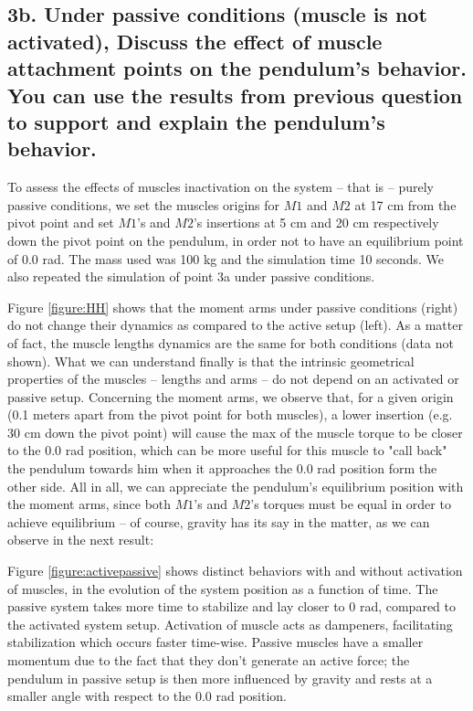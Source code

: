 \documentclass{cmc}
\begin{document}
\subsection*{3b. Under passive conditions (muscle is not activated),
  Discuss the effect of muscle attachment points on the pendulum's
  behavior. You can use the results from previous question to support
  and explain the pendulum's behavior.}
\label{sec:3b}

To assess the effects of muscles inactivation on the system -- that is -- purely passive conditions, we set the muscles origins for $M1$ and $M2$ at 17 cm from the pivot point and set $M1$'s and $M2$'s insertions at 5 cm and 20 cm respectively down the pivot point on the pendulum, in order not to have an equilibrium point of 0.0 rad. The mass used was 100 kg and the simulation time 10 seconds. We also repeated the simulation of point 3a under passive conditions.

Figure \ref{figure:HH} shows that the moment arms under passive conditions (right) do not change their dynamics as compared to the active setup (left). As a matter of fact, the muscle lengths dynamics are the same for both conditions (data not shown). What we can understand finally is that the intrinsic geometrical properties of the muscles -- lengths and arms -- do not depend on an activated or passive setup. Concerning the moment arms, we observe that, for a given origin (0.1 meters apart from the pivot point for both muscles), a lower insertion (e.g. 30 cm down the pivot point) will cause the max of the muscle torque to be closer to the 0.0 rad position, which can be more useful for this muscle to "call back" the pendulum towards him when it approaches the 0.0 rad position form the other side. All in all, we can appreciate the pendulum's equilibrium position with the moment arms, since both $M1$'s and $M2$'s torques must be equal in order to achieve equilibrium -- of course, gravity has its say in the matter, as we can observe in the next result:

Figure \ref{figure:activepassive} shows distinct behaviors with and without activation of muscles, in the evolution of the system position as a function of time. The passive system takes more time to stabilize and lay closer to 0 rad, compared to the activated system setup. Activation of muscle acts as dampeners, facilitating stabilization which occurs faster time-wise. Passive muscles have a smaller momentum due to the fact that they don't generate an active force; the pendulum in passive setup is then more influenced by gravity and rests at a smaller angle with respect to the 0.0 rad position.
\end{document}

